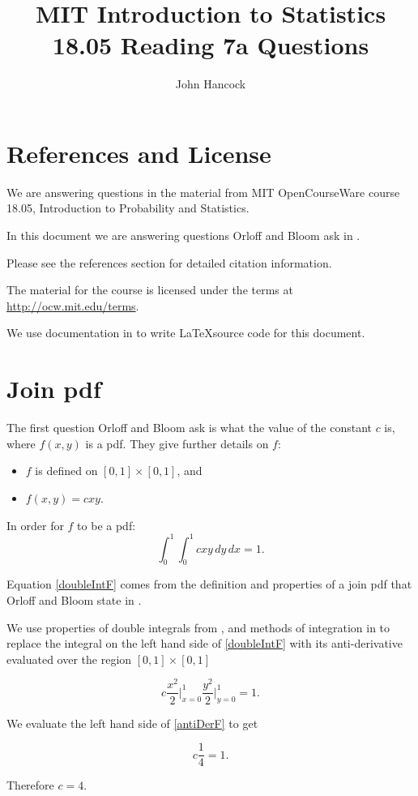 \documentclass[a4paper,11pt]{article}
\author{John Hancock}
\title{MIT Introduction to Statistics 18.05 Reading 7a Questions}
\begin{document}
\maketitle
\tableofcontents
\section{References and License}
We are answering questions in the material from MIT OpenCourseWare
course 18.05, Introduction to Probability and Statistics.

In this document we are answering questions Orloff and Bloom ask in
\cite{reading7qu}.

Please see the references section for detailed citation information.

The material for the course is licensed under the terms at
\url{http://ocw.mit.edu/terms}.

We use documentation in  to write \LaTeX source code for this
document.

\section{Join pdf}
The first question Orloff and Bloom ask is what the value of the constant
$c$ is, where $f\left(x, y\right)$ is a pdf.  They give further details
on $f$:
\begin{itemize}
  \item $f$ is defined on $\left[0,1 \right] \times \left[0, 1 \right]$, and
  \item $f \left( x, y \right) = cxy$.
\end{itemize}

In order for $f$ to be a pdf:
\begin{equation}\label{doubleIntF}
  \int_{0}^{1} \int_{0}^{1} cxy \, dy \, dx = 1.
\end{equation}

Equation \ref{doubleIntF} comes from the definition and properties
of a join pdf that Orloff and Bloom state in \cite{reading7}.

We use properties of double integrals from \cite{doubleIntProp}, and
methods of integration in \cite{doubleIntEval} to replace the
integral on the left hand side of \ref{doubleIntF} with its
anti-derivative evaluated over the region
$\left[ 0, 1 \right] \times \left[ 0, 1 \right]$

\begin{equation}\label{antiDerF}
  c \frac{x^2}{2} \bigg\rvert_{x=0}^1 \frac{y^2}{2} \bigg\rvert_{y=0}^1 = 1.
\end{equation}

We evaluate the left hand side of  \ref{antiDerF} to get

\begin{equation}\label{antiDerF}
  c \frac{1}{4}  = 1.
\end{equation}

Therefore $c=4$.


\printbibliography{}
\end{document}
